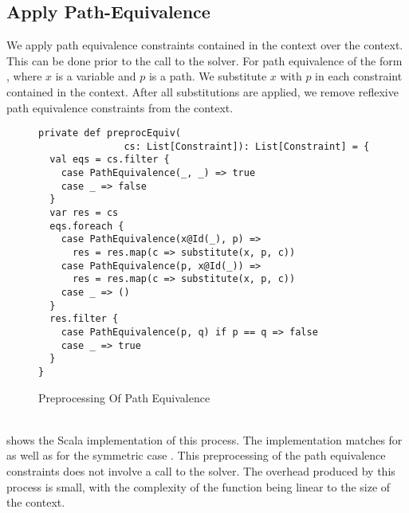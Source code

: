 \subsection{Apply Path-Equivalence}
We apply path equivalence constraints contained in the context
over the context.
This can be done prior to the call to the solver.
For path equivalence of the form ,
where $x$ is a variable and $p$ is a path.
We substitute $x$ with $p$ in each constraint
contained in the context.
After all substitutions are applied,
we remove reflexive path equivalence constraints from the context.
%
\begin{figure}[h]
\begin{lstlisting}
private def preprocEquiv(
               cs: List[Constraint]): List[Constraint] = {
  val eqs = cs.filter {
    case PathEquivalence(_, _) => true
    case _ => false
  }
  var res = cs
  eqs.foreach {
    case PathEquivalence(x@Id(_), p) =>
      res = res.map(c => substitute(x, p, c))
    case PathEquivalence(p, x@Id(_)) =>
      res = res.map(c => substitute(x, p, c))
    case _ => ()
  }
  res.filter {
    case PathEquivalence(p, q) if p == q => false
    case _ => true
  }
}
\end{lstlisting}
\caption{Preprocessing Of Path Equivalence}
\label{fig:scala-preproc-equiv}
\end{figure}\\
%
 shows the Scala
implementation of this process.
The implementation matches for 
as well as for the symmetric case .
This preprocessing of the path equivalence constraints
does not involve a call to the solver.
The overhead produced by this process
is small, with the complexity
of the function being linear to the size of the context.
\newpage

